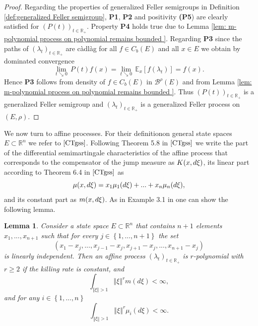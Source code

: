\documentclass[a4paper,12pt]{article}
\newtheorem{lemma}[theorem]{Lemma}
\theoremstyle{definition}
\theoremstyle{remark}
\numberwithin{equation}{section}
\numberwithin{theorem}{section}
\begin{document}
\begin{proof}
Regarding the properties of generalized Feller semigroups in Definition
\ref{def:generalized Feller semigroup},  \textbf{P1}, \textbf{P2} and positivity \textbf{(P5}) are clearly satisfied
for $\left(P(t)\right)_{t\in\mathbb{R}_{+}}$. Property \textbf{P4} holds true
due to Lemma \ref{lem: m-polynomial process on polynomial remains bounded }.
Regarding \textbf{P3} since the paths of $\left(\lambda_{t}\right)_{t\in\mathbb{R}_{+}}$
are càdlàg for all $f\in C_b(E)$ and
all $x\in E$ we obtain by dominated convergence
\[
\underset{t\searrow0}{\lim}\,P(t)f(x)=\underset{t\searrow0}{\lim}\,\mathbb{E}_{x}\left[f(\lambda_{t})\right]=f(x).
\]
Hence \textbf{P3} follows from density of $f\in C_b(E)$ in $\mathcal{\mathscr{B}}^{\rho}(E)$ and from Lemma \ref{lem: m-polynomial process on polynomial remains bounded }.
Thus $\left(P(t)\right)_{t\in\mathbb{R}_{+}}$ is a generalized Feller
semigroup and $\left(\lambda_{t}\right)_{t\in\mathbb{R}_{+}}$ is
a generalized Feller process on $\left(E,\rho\right).$
\end{proof}


We now turn to affine processes. For their definitionon general state spaces $E\subset \mathbb{R}^n$ we refer to $\cite{CTgss}$. Following Theorem 5.8 in $\cite{CTgss}$ we write the part of the differential semimartingale characteristics  of the affine process that corresponds to the compensator of the jump measure as $K(x,d\text{\ensuremath{\xi}})$, its  linear part according to Theorem 6.4 in $\cite{CTgss}$ as
\[
\mu(x,d\text{\ensuremath{\xi}})=x_{1}\mu_{1}(d\text{\ensuremath{\xi}})+...+x_{n}\mu_{n}(d\text{\ensuremath{\xi}}),
\]
and its constant part as $m(x,d\text{\ensuremath{\xi}})$. As in Example 3.1 in \cite{CMT} one can show the following lemma.


\begin{lemma}
\label{lem:affine is r-polynomial}Consider a state space $E\subset\mathbb{R}^{n}$ that contains $n+1$ elements $x_{1},...,x_{n+1}$ such that for
every $j\in\left\{ 1,...,n+1\right\} $ the set
\[
\left(x_{1}-x_{j},...,x_{j-1}-x_{j},x_{j+1}-x_{j},...,x_{n+1}-x_{j}\right)
\]
is linearly independent. Then an affine process $\left(\lambda_{t}\right)_{t\in\mathbb{R}_{+}}$
is $r$-polynomial with $r\geq2$ if the killing rate is constant, and
\[
\int_{\left\Vert \xi\right\Vert >1}\left\Vert \xi\right\Vert ^{r}m\left(d\xi\right)<\infty,
\]
and for any $i\in\left\{ 1,...,n\right\} $
\[
\int_{\left\Vert \xi\right\Vert >1}\left\Vert \xi\right\Vert ^{r}\mu_{i}\left(d\xi\right)<\infty.
\]
\end{lemma}
\end{document}

